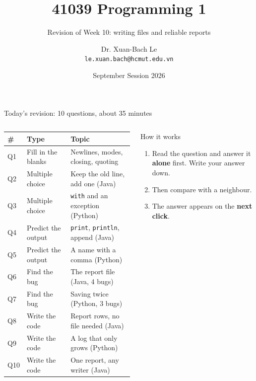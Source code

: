 \documentclass[aspectratio=169]{beamer}
\title[41039 Programming 1 --- Revision of Week 10]{41039 Programming 1}
\subtitle{Revision of Week 10: writing files and reliable reports}
\author{Dr. Xuan-Bach Le\\ \small\texttt{le.xuan.bach@hcmut.edu.vn}}
\institute{\small Faculty of Computer Science and Engineering, HCMUT}
\date{September Session 2026}
\newcommand{\code}[1]{\texttt{#1}}
\begin{document}
\begin{frame}[plain]
  \titlepage
\end{frame}

\begin{frame}{Today's revision: 10 questions, about 35 minutes}
  \begin{columns}[T,onlytextwidth]
    {\small
    \renewcommand{\arraystretch}{1.18}
    \begin{tabular}{@{}l@{\hspace{0.8em}}l@{\hspace{0.8em}}l@{}}
      \toprule
      \textbf{\#} & \textbf{Type} & \textbf{Topic}\\
      \midrule
      Q1  & Fill in the blanks & Newlines, modes, closing, quoting\\
      Q2  & Multiple choice    & Keep the old line, add one (Java)\\
      Q3  & Multiple choice    & \code{with} and an exception (Python)\\
      Q4  & Predict the output & \code{print}, \code{println}, append (Java)\\
      Q5  & Predict the output & A name with a comma (Python)\\
      Q6  & Find the bug       & The report file (Java, 4 bugs)\\
      Q7  & Find the bug       & Saving twice (Python, 3 bugs)\\
      Q8  & Write the code     & Report rows, no file needed (Java)\\
      Q9  & Write the code     & A log that only grows (Python)\\
      Q10 & Write the code     & One report, any writer (Java)\\
      \bottomrule
    \end{tabular}}
    \begin{discussionbox}{How it works}
      \small\raggedright
      \begin{enumerate}[itemsep=0.3em, topsep=0.1em, leftmargin=1.2em]
        \item Read the question and answer it \textbf{alone} first. Write your answer
              down.
        \item Then compare with a neighbour.
        \item The answer appears on the \textbf{next click}.
      \end{enumerate}
    \end{discussionbox}
  \end{columns}
\end{frame}
\end{document}
